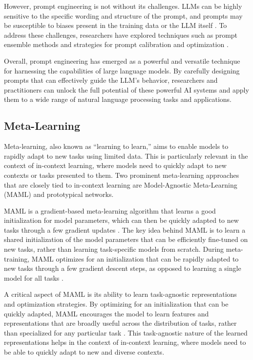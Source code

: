 \documentclass[11pt]{article}
\begin{document}
However, prompt engineering is not without its challenges. LLMs can be highly sensitive to the specific wording and structure of the prompt, and prompts may be susceptible to biases present in the training data or the LLM itself \cite{ref51,ref94}. To address these challenges, researchers have explored techniques such as prompt ensemble methods and strategies for prompt calibration and optimization \cite{ref81,ref95}.

Overall, prompt engineering has emerged as a powerful and versatile technique for harnessing the capabilities of large language models. By carefully designing prompts that can effectively guide the LLM's behavior, researchers and practitioners can unlock the full potential of these powerful AI systems and apply them to a wide range of natural language processing tasks and applications.

\subsection{Meta-Learning}

Meta-learning, also known as ``learning to learn,'' aims to enable models to rapidly adapt to new tasks using limited data. This is particularly relevant in the context of in-context learning, where models need to quickly adapt to new contexts or tasks presented to them. Two prominent meta-learning approaches that are closely tied to in-context learning are Model-Agnostic Meta-Learning (MAML) and prototypical networks.

MAML is a gradient-based meta-learning algorithm that learns a good initialization for model parameters, which can then be quickly adapted to new tasks through a few gradient updates \cite{ref96,ref97}. The key idea behind MAML is to learn a shared initialization of the model parameters that can be efficiently fine-tuned on new tasks, rather than learning task-specific models from scratch. During meta-training, MAML optimizes for an initialization that can be rapidly adapted to new tasks through a few gradient descent steps, as opposed to learning a single model for all tasks \cite{ref98}.

A critical aspect of MAML is its ability to learn task-agnostic representations and optimization strategies. By optimizing for an initialization that can be quickly adapted, MAML encourages the model to learn features and representations that are broadly useful across the distribution of tasks, rather than specialized for any particular task \cite{ref99}. This task-agnostic nature of the learned representations helps in the context of in-context learning, where models need to be able to quickly adapt to new and diverse contexts.
\end{document}
